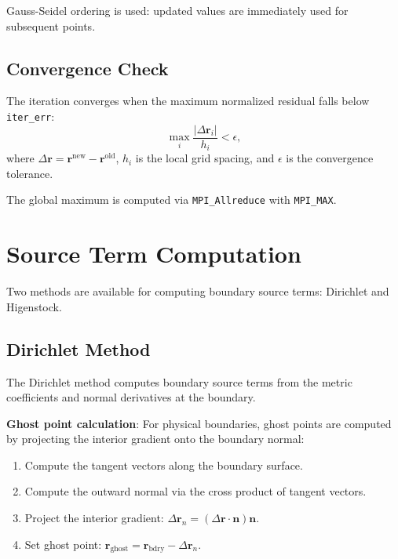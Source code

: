 \documentclass[11pt,a4paper]{report}
\newcommand{\rvec}{\bm{r}}
\newcommand{\nvec}{\bm{n}}
\begin{document}
Gauss-Seidel ordering is used: updated values are immediately used for subsequent points.

\subsection{Convergence Check}

The iteration converges when the maximum normalized residual falls below \texttt{iter\_err}:
\begin{equation}
    \max_i \frac{|\Delta \rvec_i|}{h_i} < \epsilon,
\end{equation}
where $\Delta \rvec = \rvec^{\text{new}} - \rvec^{\text{old}}$, $h_i$ is the local grid spacing, and $\epsilon$ is the convergence tolerance.

The global maximum is computed via \texttt{MPI\_Allreduce} with \texttt{MPI\_MAX}.

\section{Source Term Computation}

Two methods are available for computing boundary source terms: Dirichlet and Higenstock.

\subsection{Dirichlet Method}

The Dirichlet method computes boundary source terms from the metric coefficients and normal derivatives at the boundary.

\textbf{Ghost point calculation}: For physical boundaries, ghost points are computed by projecting the interior gradient onto the boundary normal:
\begin{enumerate}
    \item Compute the tangent vectors along the boundary surface.
    \item Compute the outward normal via the cross product of tangent vectors.
    \item Project the interior gradient: $\Delta \rvec_n = (\Delta \rvec \cdot \nvec) \nvec$.
    \item Set ghost point: $\rvec_{\text{ghost}} = \rvec_{\text{bdry}} - \Delta \rvec_n$.
\end{enumerate}
\end{document}
